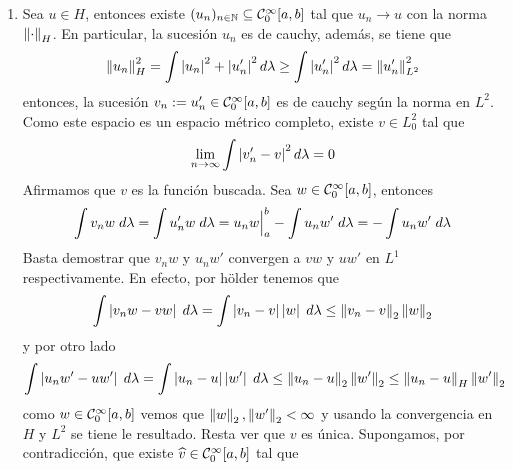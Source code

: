 \documentclass{article}
\begin{document}
\begin{enumerate}
    \item Sea $u\in H$, entonces existe $(u_{n})_{n\in\mathbb{N}}\subseteq \mathcal{C}_{0}^{\infty}[a,b]$ tal que
    $u_{n}\to u$ con la norma $\left \lVert \cdot\right \rVert_{H}$. En particular, la sucesión $u_{n}$ es de cauchy,
    además, se tiene que
    \begin{equation*}
        \left \lVert u_{n}\right \rVert_{H}^{2}=\int\left|u_{n} \right|^{2}+\left|u_{n}' \right|^{2}d\lambda
        \geq\int\left|u_{n}' \right|^{2}d\lambda=\left \lVert u_{n}'\right \rVert_{L^{2}}^{2}
    \end{equation*}
    entonces, la sucesión $v_{n}:=u_{n}'\in\mathcal{C}_{0}^{\infty}[a,b]$ es de cauchy según la norma en 
    $L^{2}$. Como este espacio es un espacio métrico completo, existe $v\in L_{0}^{2}$ tal que
    \begin{equation*}
        \lim\limits_{n\to\infty}\int\left|v'_{n}-v \right|^{2}d\lambda=0
    \end{equation*}
    Afirmamos que $v$ es la función buscada. Sea $w\in\mathcal{C}_{0}^{\infty}[a,b]$, entonces
    \begin{equation*}
        \int v_{n}w\hspace{1mm}d\lambda=\int u_{n}'w\hspace{1mm}d\lambda=u_{n}w\Big|_{a}^{b}
        -\int u_{n}w'\hspace{1mm}d\lambda=-\int u_{n}w'\hspace{1mm}d\lambda
    \end{equation*}
    Basta demostrar que $v_{n}w$ y $u_{n}w'$ convergen a $vw$ y $uw'$ en $L^{1}$ respectivamente.
    En efecto, por hölder tenemos que
    \begin{equation*}
        \int\left|v_{n}w-vw \right|\hspace{1mm}d\lambda=\int\left|v_{n}-v \right|\left|w \right|\hspace{1mm}d\lambda
        \leq\left \lVert v_{n}-v\right \rVert_{2}\left \lVert w\right \rVert_{2}
    \end{equation*}
    y por otro lado
    \begin{equation*}
        \int\left|u_{n}w'-uw' \right|\hspace{1mm}d\lambda=\int\left|u_{n}-u \right|\left|w' \right|\hspace{1mm}d\lambda
        \leq\left \lVert u_{n}-u\right \rVert_{2}\left \lVert w'\right \rVert_{2}\leq\left \lVert u_{n}-u\right \rVert_{H}\left \lVert w'\right \rVert_{2}
    \end{equation*}
    como $w\in\mathcal{C}_{0}^{\infty}[a,b]$ vemos que $\left \lVert w\right \rVert_{2},\left \lVert w'\right \rVert_{2}<\infty$ y usando la 
    convergencia en $H$ y $L^{2}$ se tiene le resultado. Resta ver que $v$ es única. Supongamos, 
    por contradicción, que existe $\widehat{v}\in\mathcal{C}_{0}^{\infty}[a,b]$ tal que
    \begin{equation*}

\end{equation*}
\end{enumerate}
\end{document}
